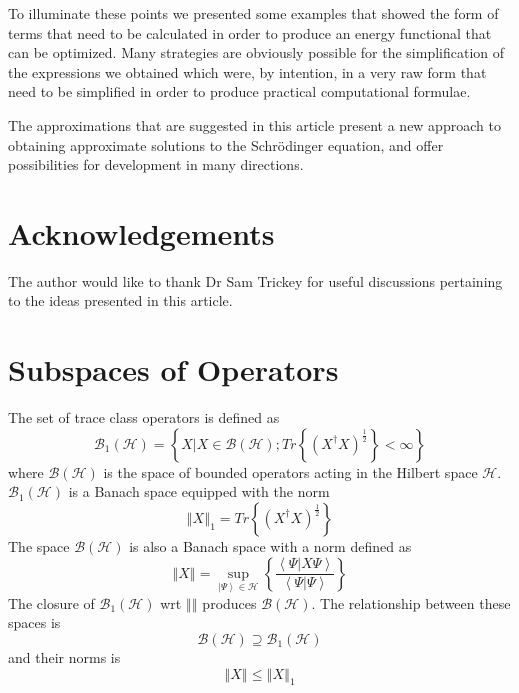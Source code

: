 \documentclass[aps,preprint]{revtex4}%
\begin{document}
To illuminate these points we presented some examples that showed the form of
terms that need to be calculated in order to produce an energy functional that
can be optimized. Many strategies are obviously possible for the
simplification of the expressions we obtained which were, by intention, in a
very raw form that need to be simplified in order to produce practical
computational formulae.

The approximations that are suggested in this article present a new approach
to obtaining approximate solutions to the Schr\"{o}dinger equation, and offer
possibilities for development in many directions.

\section{Acknowledgements}

The author would like to thank Dr Sam Trickey for useful discussions
pertaining to the ideas presented in this article.

\appendix

\section{Subspaces of Operators\label{spaces}}

The set of trace class operators is defined as
\begin{equation}
\mathcal{B}_{1}\left(  \mathcal{H}\right)  =\left\{  X|X\in\mathcal{B}\left(
\mathcal{H}\right)  ;Tr\left\{  \left(  X^{\dagger}X\right)  ^{\frac{1}{2}%
}\right\}  <\infty\right\}
\end{equation}
where $\mathcal{B}\left(  \mathcal{H}\right)  $ is the space of bounded
operators acting in the Hilbert space $\mathcal{H}$. $\mathcal{B}_{1}\left(
\mathcal{H}\right)  $ is a Banach space equipped with the norm
\begin{equation}
\left\Vert X\right\Vert _{1}=Tr\left\{  \left(  X^{\dagger}X\right)
^{\frac{1}{2}}\right\}
\end{equation}
The space $\mathcal{B}\left(  \mathcal{H}\right)  $ is also a Banach space
with a norm defined as
\begin{equation}
\left\Vert X\right\Vert =\sup_{\left\vert \Psi\right\rangle \in\mathcal{H}%
}\left\{  \frac{\left\langle \Psi|X\Psi\right\rangle }{\left\langle \Psi
|\Psi\right\rangle }\right\}
\end{equation}
The closure of $\mathcal{B}_{1}\left(  \mathcal{H}\right)  $ wrt $\left\Vert
{}\right\Vert $ produces $\mathcal{B}\left(  \mathcal{H}\right)  $. The
relationship between these spaces is
\begin{equation}
\mathcal{B}\left(  \mathcal{H}\right)  \supseteq\mathcal{B}_{1}\left(
\mathcal{H}\right)
\end{equation}
and their norms is
\begin{equation}
\left\Vert X\right\Vert \leq\left\Vert X\right\Vert _{1}%
\end{equation}
\end{document}
